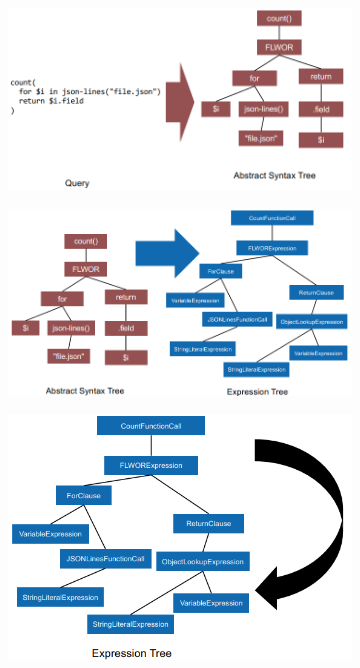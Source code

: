 \documentclass[11pt,oneside,a4paper]{article}
\begin{document}
{\begin{figure}[t!]
	\centering
	\begin{subfigure}[t]{.3\textwidth}
		\centering
		\includegraphics[width=1\linewidth]{figures/querytrees_processing_1}
	\end{subfigure}%
	\begin{subfigure}[t]{.3\textwidth}
		\centering
		\includegraphics[width=0.8\linewidth]{figures/querytrees_processing_2}
	\end{subfigure}
	\begin{subfigure}[t]{.3\textwidth}
		\centering
		\includegraphics[width=0.8\linewidth]{figures/querytrees_processing_3}

\end{subfigure}
\end{figure}}
\end{document}
